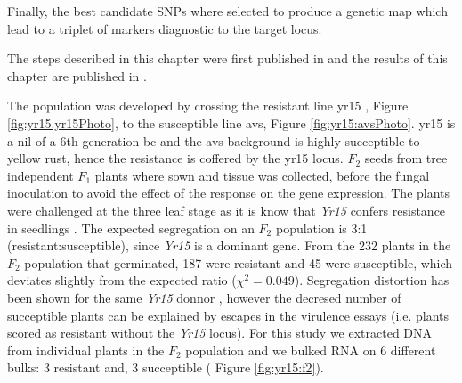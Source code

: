 Finally, the best candidate SNPs where selected to produce a genetic map which lead to a triplet of markers diagnostic to the target locus. 

The steps described in this chapter were first published in \citet{Ramirez-Gonzalez2015c} and the results of this chapter are published in \citet{Ramirez-Gonzalez2015b}.

The population was developed by crossing the resistant line \gls{yr15} \citep{Wellings1998}, Figure \ref{fig:yr15.yr15Photo}, to the susceptible line \gls{avs}, Figure \ref{fig:yr15:avsPhoto}. 
\acrshort{yr15} is a \gls{nil} of a 6th generation \gls{bc} and the \acrshort{avs} background is highly succeptible to yellow rust, hence the resistance is coffered by the \acrshort{yr15} locus. 
$F_{2}$ seeds from tree independent $F_{1}$ plants where sown and tissue was collected, before the fungal inoculation to avoid the effect of the response on the gene expression.  
The plants were challenged at the three leaf stage as it is know that \textit{Yr15} confers resistance in seedlings \citep{Gerechter-Amitai1989}.
The expected segregation on an $F_{2}$ population is 3:1 (resistant:susceptible), since \textit{Yr15} is a dominant gene.
From the 232 plants in the $F_{2}$ population that germinated, 187 were resistant and 45 were susceptible, which deviates slightly from the expected ratio ($\chi^{2}=0.049$).
Segregation distortion has been shown for the same \textit{Yr15} donnor \citep{Randhawa2009}, however the decresed number of succeptible plants can be explained by escapes in the virulence essays (i.e. plants scored as resistant without the \textit{Yr15} locus).   For this study we extracted DNA from individual plants in the $F_{2}$ population and we bulked RNA on 6 different bulks: 3 resistant and, 3 succeptible ( Figure \ref{fig:yr15:f2}). 


